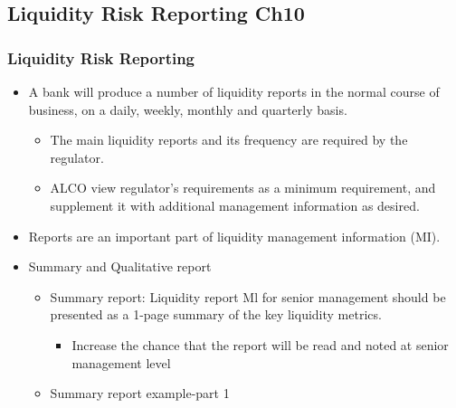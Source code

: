 \subsection{Liquidity Risk Reporting Ch10}

\subsubsection{Liquidity Risk Reporting}
\begin{itemize}
\item A bank will produce a number of liquidity reports in the normal course of business, on a daily, weekly, monthly and quarterly basis.
    \begin{itemize}
    \item The main liquidity reports and its frequency are required by the regulator.
    \item ALCO view regulator's requirements as a minimum requirement, and supplement it with additional management information as desired.
    \end{itemize}
    
\item Reports are an important part of liquidity management information (MI).
\item Summary and Qualitative report
    \begin{itemize}
    \item Summary report: Liquidity report Ml for senior management should be presented as a 1-page summary of the key liquidity metrics.
        \begin{itemize}
        \item Increase the chance that the report will be read and noted at senior management level
        \end{itemize}
    \item Summary report example-part 1
    


\end{itemize}
\end{itemize}
